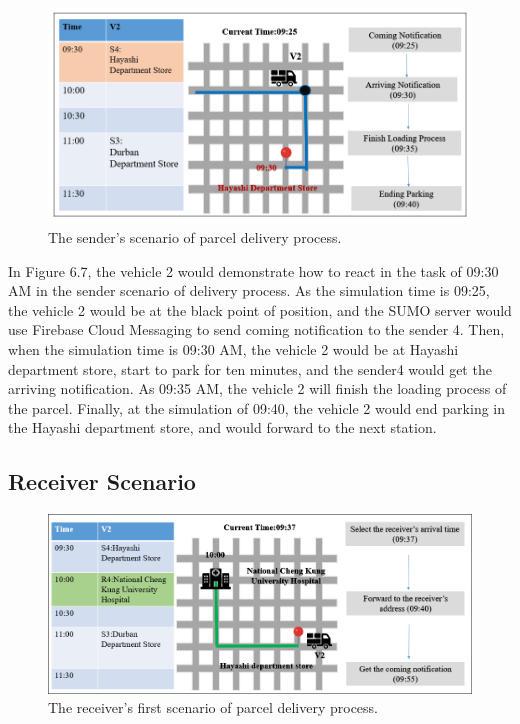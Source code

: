 \documentclass[12pt]{ksthesis}
\begin{document}
\begin{thesis}
{\begin{figure}[H]
\centering
\includegraphics[width=1.0\textwidth]{./Thesis_figures/F6-7_senderScenario.PNG}
\caption{\large The sender's scenario of parcel delivery process.}
\vspace{0.5cm}
\label{Fig:senderScenario_DeliveryPorcess}
\end{figure}

In Figure 6.7, the vehicle 2 would demonstrate how to react in the task of 09:30 AM in the sender scenario of delivery process. As the simulation time is 09:25, the vehicle 2 would be at the black point of position, and the SUMO server would use Firebase Cloud Messaging to send coming notification to the sender 4. Then, when the simulation time is 09:30 AM, the vehicle 2 would be at Hayashi department store, start to park for ten minutes, and the sender4 would get the arriving notification.
As 09:35 AM, the vehicle 2 will finish the loading process of the parcel. Finally, at the simulation of 09:40, the vehicle 2 would end parking in the Hayashi department store, and would forward to the next station.

\subsection{Receiver Scenario}

\begin{figure}[t]
\centering
\includegraphics[width=1.0\textwidth]{./Thesis_figures/F6-8_receiverScenario1.PNG}
\caption{\large The receiver's first scenario of parcel delivery process.}
\vspace{0.5cm}
\label{Fig:FirsrtReceiverScenario_deliveryProcess}
\end{figure}

}
\end{thesis}
\end{document}
